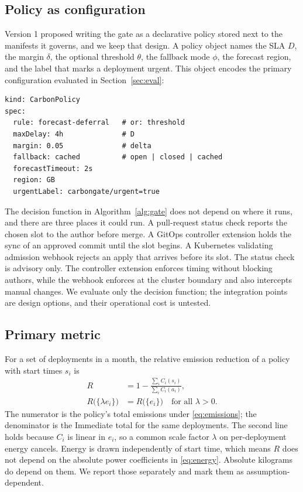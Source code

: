 \documentclass[journal]{IEEEtran}
\begin{document}
\subsection{Policy as configuration}
Version 1 proposed writing the gate as a declarative policy stored next to the manifests it governs, and we keep that design. A policy object names the SLA $D$, the margin $\delta$, the optional threshold $\theta$, the fallback mode $\phi$, the forecast region, and the label that marks a deployment urgent. This object encodes the primary configuration evaluated in Section~\ref{sec:eval}:

{\footnotesize
\begin{verbatim}
kind: CarbonPolicy
spec:
  rule: forecast-deferral   # or: threshold
  maxDelay: 4h              # D
  margin: 0.05              # delta
  fallback: cached          # open | closed | cached
  forecastTimeout: 2s
  region: GB
  urgentLabel: carbongate/urgent=true
\end{verbatim}
}
The decision function in Algorithm~\ref{alg:gate} does not depend on where it runs, and there are three places it could run. A pull-request status check reports the chosen slot to the author before merge. A GitOps controller extension holds the sync of an approved commit until the slot begins. A Kubernetes validating admission webhook \cite{k8sadmission} rejects an apply that arrives before its slot. The status check is advisory only. The controller extension enforces timing without blocking authors, while the webhook enforces at the cluster boundary and also intercepts manual changes. We evaluate only the decision function; the integration points are design options, and their operational cost is untested.

\subsection{Primary metric}
For a set of deployments in a month, the relative emission reduction of a policy with start times $s_i$ is
\begin{equation}
\begin{aligned}
R &= 1 - \frac{\sum_i C_i(s_i)}{\sum_i C_i(a_i)},\\
R\big(\{\lambda e_i\}\big) &= R\big(\{e_i\}\big) \quad \text{for all } \lambda > 0.
\end{aligned}
\label{eq:reduction}
\end{equation}
The numerator is the policy's total emissions under \eqref{eq:emissions}; the denominator is the Immediate total for the same deployments. The second line holds because $C_i$ is linear in $e_i$, so a common scale factor $\lambda$ on per-deployment energy cancels. Energy is drawn independently of start time, which means $R$ does not depend on the absolute power coefficients in \eqref{eq:energy}. Absolute kilograms do depend on them. We report those separately and mark them as assumption-dependent.
\end{document}
